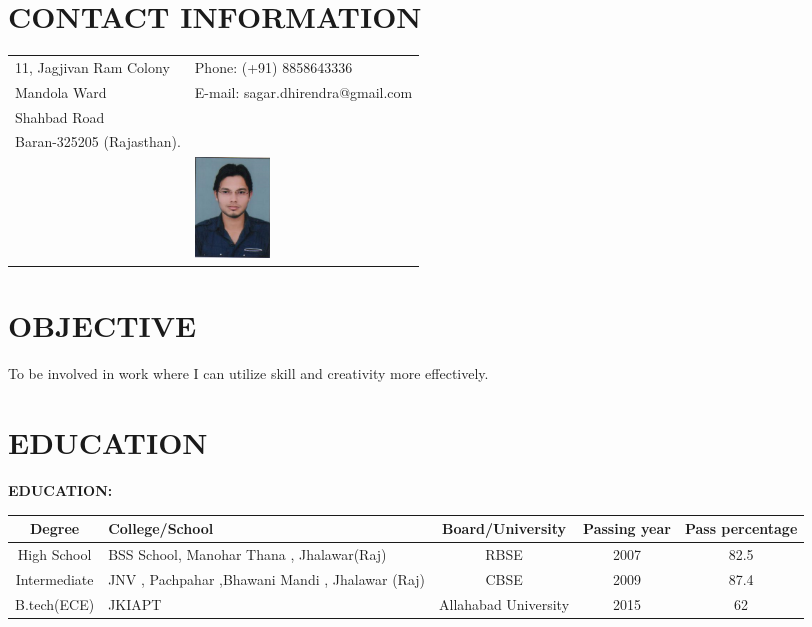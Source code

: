 \documentclass[margin,line]{res}
\begin{document}
	
	
	\begin{resume}
		\section{\sc \bf CONTACT INFORMATION}
		\vspace{.05in}
		\begin{tabular}{@{}p{3.5in}p{3in}}
			11, Jagjivan Ram Colony             & {Phone:}  (+91) 8858643336 \\
			Mandola Ward      			& {E-mail:} sagar.dhirendra@gmail.com\\
			Shahbad Road\\
			Baran-325205 (Rajasthan).\\	&\includegraphics[width=20mm]{dhirendra.jpg}
		\end{tabular}
		
		\section{\sc \bf OBJECTIVE}
		To be involved in work where I can utilize skill and creativity more effectively.
		
		\section{\sc \bf EDUCATION}
		\textbf{EDUCATION:}  \\
		\begin{tabular}{|c|p{5cm}|c|c|c|}
			\hline
			Degree & College/School & Board/University & Passing year & Pass percentage  \\
			\hline
			High School & BSS School, Manohar Thana , Jhalawar(Raj) & RBSE & 2007 & 82.5 \\
			\hline
			Intermediate & JNV , Pachpahar ,Bhawani Mandi , Jhalawar (Raj) & CBSE & 2009 & 87.4  \\
			\hline
			B.tech(ECE) & JKIAPT & Allahabad University & 2015 & 62   \\
			\hline
		\end{tabular}   \\ \\ \\
		

\end{resume}
\end{document}
